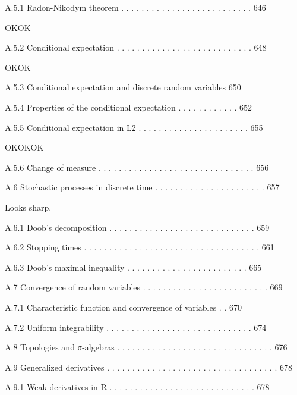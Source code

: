 A.5.1 Radon-Nikodym theorem . . . . . . . . . . . . . . . . . . . . . . . . . . 646

OKOK

A.5.2 Conditional expectation . . . . . . . . . . . . . . . . . . . . . . . . . . . 648

OKOK

A.5.3 Conditional expectation and discrete random variables 650



A.5.4 Properties of the conditional expectation . . . . . . . . . . . . 652



A.5.5 Conditional expectation in L2 . . . . . . . . . . . . . . . . . . . . . . 655

OKOKOK

A.5.6 Change of measure . . . . . . . . . . . . . . . . . . . . . . . . . . . . . . . 656



A.6 Stochastic processes in discrete time . . . . . . . . . . . . . . . . . . . . . . 657

Looks sharp.

A.6.1 Doob's decomposition . . . . . . . . . . . . . . . . . . . . . . . . . . . . . 659



A.6.2 Stopping times . . . . . . . . . . . . . . . . . . . . . . . . . . . . . . . . . . . 661



A.6.3 Doob's maximal inequality . . . . . . . . . . . . . . . . . . . . . . . . 665



A.7 Convergence of random variables . . . . . . . . . . . . . . . . . . . . . . . . . 669



A.7.1 Characteristic function and convergence of variables . . 670



A.7.2 Uniform integrability . . . . . . . . . . . . . . . . . . . . . . . . . . . . . 674



A.8 Topologies and σ-algebras . . . . . . . . . . . . . . . . . . . . . . . . . . . . . . . 676



A.9 Generalized derivatives . . . . . . . . . . . . . . . . . . . . . . . . . . . . . . . . . . 678



A.9.1 Weak derivatives in R . . . . . . . . . . . . . . . . . . . . . . . . . . . . . 678




